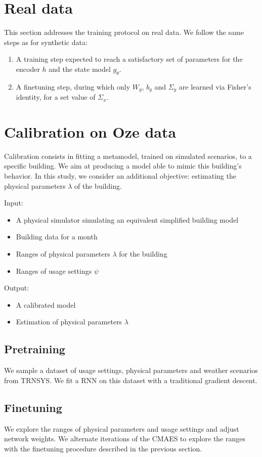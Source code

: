 \documentclass[10pt,a4paper]{report}
\begin{document}
\section{Real data}
This section addresses the training protocol on real data.
We follow the same steps as for synthetic data:

\begin{enumerate}
	\item A training step expected to reach a satisfactory set of parameters for the encoder $h$ and the state model $g_\theta$.
	\item A finetuning step, during which only $W_y$, $b_y$ and $\Sigma_y$ are learned via Fisher's identity, for a set value of $\Sigma_x$.
\end{enumerate}

\clearpage
\section{Calibration on Oze data}
Calibration consists in fitting a metamodel, trained on simulated scenarios, to a specific building.
We aim at producing a model able to mimic this building's behavior.
In this study, we consider an additional objective: estimating the physical parameters $\lambda$ of the building.

Input:
\begin{itemize}
	\item A physical simulator simulating an equivalent simplified building model
	\item Building data for a month
	\item Ranges of physical parameters $\lambda$ for the building
	\item Ranges of usage settings $\psi$
\end{itemize}

Output:
\begin{itemize}
	\item A calibrated model
	\item Estimation of physical parameters $\lambda$
\end{itemize}

\subsection{Pretraining}
We sample a dataset of usage settings, physical parameters and weather scenarios from TRNSYS.
We fit a RNN on this dataset with a traditional gradient descent.

\subsection{Finetuning}
We explore the ranges of physical parameters and usage settings and adjust network weights.
We alternate iterations of the CMAES to explore the ranges with the finetuning procedure described in the previous section.
\end{document}
